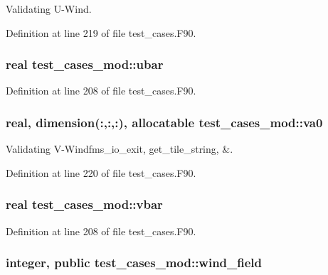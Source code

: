 Validating U-\/\-Wind. 



Definition at line 219 of file test\-\_\-cases.\-F90.

\subsubsection[{ubar}]{\setlength{\rightskip}{0pt plus 5cm}real test\-\_\-cases\-\_\-mod\-::ubar\hspace{0.3cm}{\ttfamily [private]}}\label{classtest__cases__mod_a3511ba6fb2dcfd0c5575f0568a060924}


Definition at line 208 of file test\-\_\-cases.\-F90.

\subsubsection[{va0}]{\setlength{\rightskip}{0pt plus 5cm}real, dimension(\-:,\-:,\-:), allocatable test\-\_\-cases\-\_\-mod\-::va0\hspace{0.3cm}{\ttfamily [private]}}\label{classtest__cases__mod_ae762ff3757574df1e4826d061587ee9f}


Validating V-\/\-Windfms\-\_\-io\-\_\-exit, get\-\_\-tile\-\_\-string, \&. 



Definition at line 220 of file test\-\_\-cases.\-F90.

\subsubsection[{vbar}]{\setlength{\rightskip}{0pt plus 5cm}real test\-\_\-cases\-\_\-mod\-::vbar\hspace{0.3cm}{\ttfamily [private]}}\label{classtest__cases__mod_a8c4fdfdfac04288502c9ec94febd848a}


Definition at line 208 of file test\-\_\-cases.\-F90.

\subsubsection[{wind\-\_\-field}]{\setlength{\rightskip}{0pt plus 5cm}integer, public test\-\_\-cases\-\_\-mod\-::wind\-\_\-field}\label{classtest__cases__mod_a81ce24e79fd0973f5bfc7fdc8aaf16a8}


